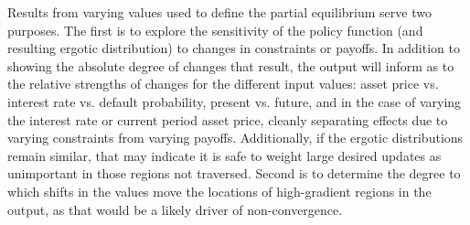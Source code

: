\documentclass[english]{article}
\begin{document}
Results from varying values used to define the partial equilibrium serve two purposes. The first is 
to explore the sensitivity of the policy function (and resulting ergotic distribution) to changes in 
constraints or payoffs. In addition to showing the absolute degree of changes that result, the output 
will inform as to the relative strengths of changes for the different input values: asset price vs. 
interest rate vs. default probability, present vs. future, and in the case of varying the interest rate 
or current period asset price, cleanly separating effects due to varying constraints from varying 
payoffs. Additionally, if the ergotic distributions remain similar, that may indicate it is safe to 
weight large desired updates as unimportant in those regions not traversed.  Second is to determine 
the degree to which shifts in the values move the locations of high-gradient regions in the output, 
as that would be a likely driver of non-convergence. 
\end{document}
